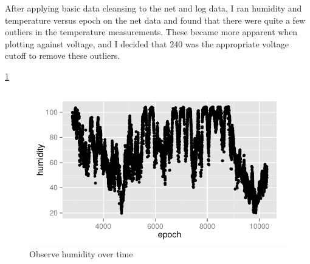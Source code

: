 \documentclass{article}\usepackage[]{graphicx}\usepackage[]{color}
\makeatletter
\def\maxwidth{ %
  \ifdim\Gin@nat@width>\linewidth
    \linewidth
  \else
    \Gin@nat@width
  \fi
}
\newenvironment{knitrout}{}{} %
\makeatother
\begin{document}
After applying basic data cleansing to the net and log data, I ran humidity and temperature versus epoch on the net data and found that there were quite a few outliers in the temperature measurements.  These became more apparent when plotting against voltage, and I decided that 240 was the appropriate voltage cutoff to remove these outliers.

\ref{fig:plot_raw_net_epoch_humidity}

\begin{knitrout}
\color{fgcolor}\begin{figure}[h!]


{\centering \includegraphics[width=\maxwidth]{figure/plot_raw_net_epoch_humidity} 

}

\caption[Observe humidity over time]{Observe humidity over time\label{fig:plot_raw_net_epoch_humidity}}
\end{figure}


\end{knitrout}
\end{document}
